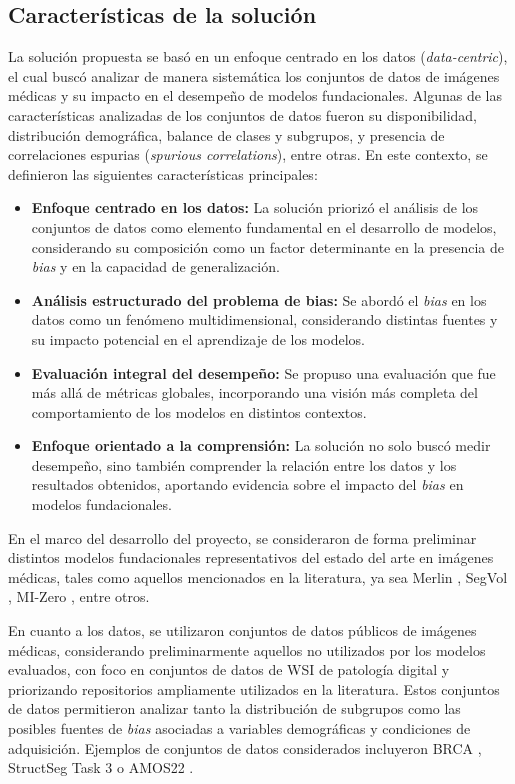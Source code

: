 \subsection{Características de la solución}

La solución propuesta se basó en un enfoque centrado en los datos (\textit{data-centric}), el cual buscó analizar de manera sistemática los conjuntos de datos de imágenes médicas y su impacto en el desempeño de modelos fundacionales.
Algunas de las características analizadas de los conjuntos de datos fueron su disponibilidad, distribución demográfica, balance de clases y subgrupos, y presencia de correlaciones espurias (\textit{spurious correlations}), entre otras. En este contexto, se definieron las siguientes características principales:

\begin{itemize}
\item \textbf{Enfoque centrado en los datos:} La solución priorizó el análisis de los conjuntos de datos como elemento fundamental en el desarrollo de modelos, considerando su composición como un factor determinante en la presencia de \textit{bias} y en la capacidad de generalización.
\item \textbf{Análisis estructurado del problema de bias:} Se abordó el \textit{bias} en los datos como un fenómeno multidimensional, considerando distintas fuentes y su impacto potencial en el aprendizaje de los modelos.
\item \textbf{Evaluación integral del desempeño:} Se propuso una evaluación que fue más allá de métricas globales, incorporando una visión más completa del comportamiento de los modelos en distintos contextos.
\item \textbf{Enfoque orientado a la comprensión:} La solución no solo buscó medir desempeño, sino también comprender la relación entre los datos y los resultados obtenidos, aportando evidencia sobre el impacto del \textit{bias} en modelos fundacionales.
\end{itemize}

En el marco del desarrollo del proyecto, se consideraron de forma preliminar distintos modelos fundacionales representativos del estado del arte en imágenes médicas, tales como aquellos mencionados en la literatura, ya sea Merlin \parencite{Blankemeier_2026}, SegVol \parencite{du2025segvoluniversalinteractivevolumetric}, MI-Zero \parencite{lu2023visuallanguagepretrainedmultiple}, entre otros. 

En cuanto a los datos, se utilizaron conjuntos de datos públicos de imágenes médicas, considerando preliminarmente aquellos no utilizados por los modelos evaluados, con foco en conjuntos de datos de WSI de patología digital y priorizando repositorios ampliamente utilizados en la literatura. Estos conjuntos de datos permitieron analizar tanto la distribución de subgrupos como las posibles fuentes de \textit{bias} asociadas a variables demográficas y condiciones de adquisición. Ejemplos de conjuntos de datos considerados incluyeron BRCA \parencite{lu2023visuallanguagepretrainedmultiple}, StructSeg Task 3 \parencite{Ulrich_2023} o AMOS22 \parencite{du2025segvoluniversalinteractivevolumetric}.

